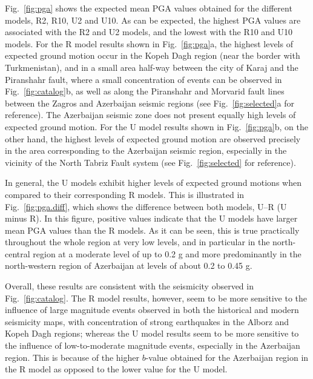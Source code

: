 Fig.~\ref{fig:pga} shows the expected mean PGA values obtained  for the different models, R2, R10, U2 and U10. As can be expected, the highest PGA values are associated with the R2 and U2 models, and the lowest with the R10 and U10 models. For the R model results shown in Fig.~\ref{fig:pga}a, the highest levels of expected ground motion occur in the Kopeh Dagh region (near the border with Turkmenistan), and in a small area half-way between the city of Karaj and the Piranshahr fault, where a small concentration of events can be observed in Fig.~\ref{fig:catalog}b, as well as along the Piranshahr and Morvarid fault lines between the Zagros and Azerbaijan seismic regions (see Fig.~\ref{fig:selected}a for reference). The Azerbaijan seismic zone does not present equally high levels of expected ground motion. For the U model results shown in Fig.~\ref{fig:pga}b, on the other hand, the highest levels of expected ground motion are observed precisely in the area corresponding to the Azerbaijan seismic region, especially in the vicinity of the North Tabriz Fault system (see Fig.~\ref{fig:selected} for reference).

In general, the U models exhibit higher levels of expected ground motions when compared to their corresponding R models. This is illustrated in Fig.~\ref{fig:pga.diff}, which shows the difference between both models, U--R (U minus R). In this figure, positive values indicate that the U models have larger mean PGA values than the R models. As it can be seen, this is true practically throughout the whole region at very low levels, and in particular in the north-central region at a moderate level of up to 0.2 g and more predominantly in the north-western region of Azerbaijan at levels of about 0.2 to 0.45 g.

Overall, these results are consistent with the seismicity observed in Fig.~\ref{fig:catalog}. The R model results, however, seem to be more sensitive to the influence of large magnitude events observed in both the historical and modern seismicity maps, with  concentration of strong earthquakes in the Alborz and Kopeh Dagh regions; whereas the U model results seem to be more sensitive to the influence of low-to-moderate magnitude events, especially in the Azerbaijan region. This is because of the higher $b$-value obtained for the Azerbaijan region in the R model as opposed to the lower value for the U model.

